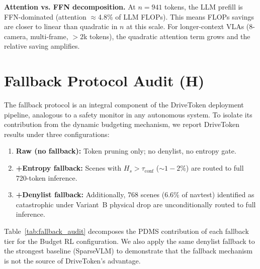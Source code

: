 \documentclass[letterpaper]{article}
\begin{document}
\textbf{Attention vs. FFN decomposition.} At $n{=}941$ tokens, the LLM prefill is FFN-dominated
(attention $\approx$4.8\% of LLM FLOPs). This means FLOPs savings are closer to linear than
quadratic in $n$ at this scale. For longer-context VLAs (8-camera, multi-frame, $>2$k tokens), the
quadratic attention term grows and the relative saving amplifies.

\section{Fallback Protocol Audit (H)}
\label{sec:fallback_audit}

The fallback protocol is an integral component of the DriveToken deployment pipeline, analogous to
a safety monitor in any autonomous system. To isolate its contribution from the dynamic budgeting
mechanism, we report DriveToken results under three configurations:
\begin{enumerate}
  \item \textbf{Raw (no fallback):} Token pruning only; no denylist, no entropy gate.
  \item \textbf{+Entropy fallback:} Scenes with $H_s > \tau_{\mathrm{conf}}$ (${\sim}1{-}2\%$) are
    routed to full 720-token inference.
  \item \textbf{+Denylist fallback:} Additionally, 768 scenes (6.6\% of navtest) identified as
    catastrophic under Variant~B physical drop are unconditionally routed to full inference.
\end{enumerate}

Table~\ref{tab:fallback_audit} decomposes the PDMS contribution of each fallback tier for the
Budget RL configuration. We also apply the same denylist fallback to the strongest baseline
(SparseVLM) to demonstrate that the fallback mechanism is not the source of DriveToken's advantage.
\end{document}
